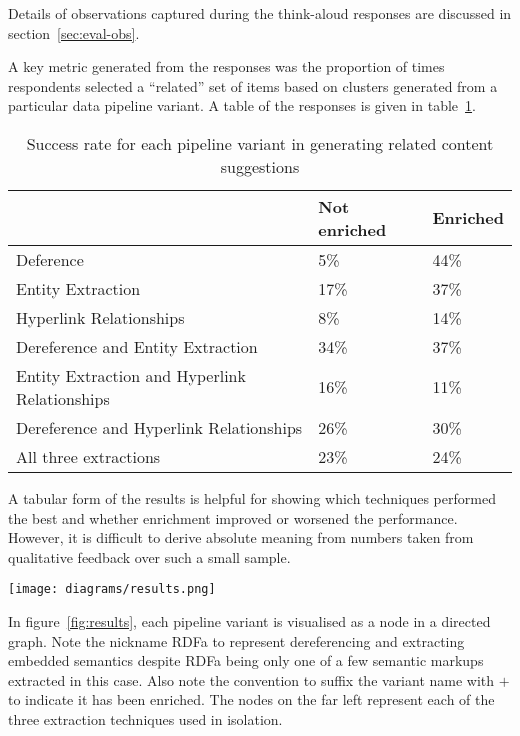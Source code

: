 Details of observations captured during the think-aloud responses
are discussed in section~\ref{sec:eval-obs}.

A key metric generated from the responses was the proportion of times
respondents selected a ``related'' set of items based on clusters
generated from a particular data pipeline variant. A table of the
responses is given in table~\ref{tbl:results}.

\begin{table}[h]
  \centering
  \caption{Success rate for each pipeline variant in generating related content suggestions}
  \label{tbl:results}
  \begin{tabular}{|l|ll|}
  \hline
    & Not enriched & Enriched \\
    \hline
    Deference                                     & 5\%          & 44\%     \\
    Entity Extraction                             & 17\%         & 37\%     \\
    Hyperlink Relationships                       & 8\%          & 14\%     \\
    Dereference and Entity Extraction             & 34\%         & 37\%     \\
    Entity Extraction and Hyperlink Relationships & 16\%         & 11\%     \\
    Dereference and Hyperlink Relationships       & 26\%         & 30\%     \\
    All three extractions                         & 23\%         & 24\%     \\
\hline
  \end{tabular}
\end{table}

A tabular form of the results is helpful for showing which techniques
performed the best and whether enrichment improved or worsened the
performance. However, it is difficult to derive absolute meaning
from numbers taken from qualitative feedback over such a small
sample.

\begin{sidewaysfigure}
  \begin{center}
    \texttt{[image: diagrams/results.png]}
  \end{center}
  \caption{Visualisation of performance of each data pipeline variant\label{fig:results}}
\end{sidewaysfigure}


In figure~\ref{fig:results}, each pipeline variant is visualised
as a node in a directed graph. Note the nickname RDFa to represent
dereferencing and extracting embedded semantics despite RDFa being
only one of a few semantic markups extracted in this case. Also note
the convention to suffix the variant name with $+$ to indicate it
has been enriched. The nodes
on the far left represent each of the three extraction techniques
used in isolation.

